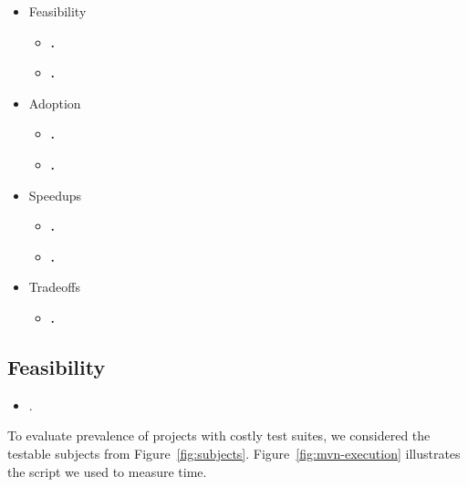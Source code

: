 \begin{itemize}
\item Feasibility
  \begin{itemize}
  \item \textbf{\numRQFeasibilityOne.} \RQFeasibilityOne
  \item \textbf{\numRQFeasibilityTwo.} \RQFeasibilityTwo    
  \end{itemize}
\item Adoption
  \begin{itemize}
  \item \textbf{\numRQAdoptionOne.} \RQAdoptionOne    
  \item \textbf{\numRQAdoptionTwo.} \RQAdoptionTwo
  \end{itemize}
\item Speedups
  \begin{itemize}
  \item \textbf{\numRQSpeedupOne.} \RQSpeedupOne
  \item \textbf{\numRQSpeedupTwo.} \RQSpeedupTwo
  \end{itemize}      
\item Tradeoffs
  \begin{itemize}
  \item \textbf{\numRQIssuesOne.} \RQIssuesOne    
  \end{itemize}
\end{itemize}


\subsection{Feasibility}
\label{sec:rqA}
\label{sec:rqB}

\begin{itemize}
    \item \numRQFeasibilityOne{}. \textbf{\RQFeasibilityOne}
\end{itemize}

To evaluate prevalence of projects with costly test suites, we
considered the \numSubjs{} testable subjects from
Figure~\ref{fig:subjects}.  Figure~\ref{fig:mvn-execution} illustrates
the script we used to measure time.

